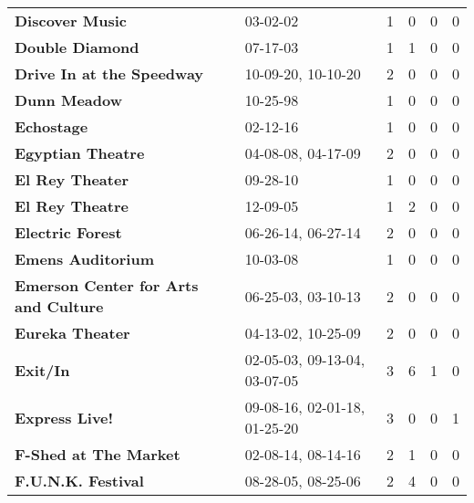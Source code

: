 \begin{supertabular}{llllll}
                                              \textbf{Discover Music} &                      03-02-02 &  1 &   0 &  0 &  0 \\
                                              \textbf{Double Diamond} &                      07-17-03 &  1 &   1 &  0 &  0 \\
                                    \textbf{Drive In at the Speedway} &            10-09-20, 10-10-20 &  2 &   0 &  0 &  0 \\
                                                 \textbf{Dunn Meadow} &                      10-25-98 &  1 &   0 &  0 &  0 \\
                                                   \textbf{Echostage} &                      02-12-16 &  1 &   0 &  0 &  0 \\
                                            \textbf{Egyptian Theatre} &            04-08-08, 04-17-09 &  2 &   0 &  0 &  0 \\
                                              \textbf{El Rey Theater} &                      09-28-10 &  1 &   0 &  0 &  0 \\
                                              \textbf{El Rey Theatre} &                      12-09-05 &  1 &   2 &  0 &  0 \\
                                             \textbf{Electric Forest} &            06-26-14, 06-27-14 &  2 &   0 &  0 &  0 \\
                                            \textbf{Emens Auditorium} &                      10-03-08 &  1 &   0 &  0 &  0 \\
                         \textbf{Emerson Center for Arts and Culture} &            06-25-03, 03-10-13 &  2 &   0 &  0 &  0 \\
                                              \textbf{Eureka Theater} &            04-13-02, 10-25-09 &  2 &   0 &  0 &  0 \\
                                                     \textbf{Exit/In} &  02-05-03, 09-13-04, 03-07-05 &  3 &   6 &  1 &  0 \\
                                               \textbf{Express Live!} &  09-08-16, 02-01-18, 01-25-20 &  3 &   0 &  0 &  1 \\
                                        \textbf{F-Shed at The Market} &            02-08-14, 08-14-16 &  2 &   1 &  0 &  0 \\
                                           \textbf{F.U.N.K. Festival} &            08-28-05, 08-25-06 &  2 &   4 &  0 &  0 \\

\end{supertabular}
